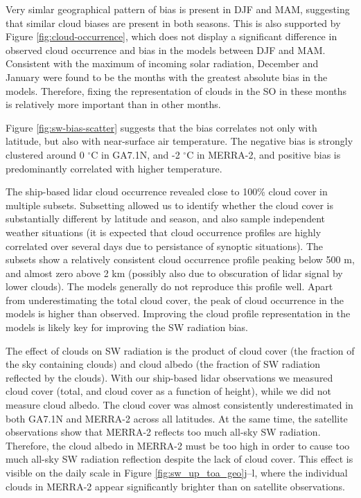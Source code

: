  Very simlar geographical pattern of bias is present in DJF and
MAM, suggesting that similar cloud biases are present in both seasons. This
is also supported by Figure \ref{fig:cloud-occurrence}, which does not display
a significant difference in observed cloud occurrence and bias in the models
between DJF and MAM.  Consistent with the maximum of incoming solar radiation,
December and January were found to be the months with the greatest absolute
bias in the models. Therefore, fixing the representation of clouds in the SO
in these months is relatively more important than in other months.

Figure \ref{fig:sw-bias-scatter} suggests that the bias correlates not only
with latitude, but also with near-surface air temperature. The negative bias
is strongly clustered around 0 $^\circ$C in GA7.1N, and -2 $^\circ$C in
MERRA-2, and positive bias is predominantly correlated with higher temperature.

The ship-based lidar cloud occurrence revealed close to 100\% cloud cover in
multiple subsets. Subsetting allowed us to identify whether the cloud cover is
substantially different by latitude and season, and also sample independent
weather situations (it is expected that cloud occurrence profiles are highly
correlated over several days due to persistance of synoptic situations). The
subsets show a relatively consistent cloud occurrence profile peaking below 500
m, and almost zero above 2 km (possibly also due to
obscuration of lidar signal by lower clouds). The models generally do not
reproduce this profile well. Apart from underestimating the total cloud cover,
the peak of cloud occurrence in the models is higher than observed. Improving
the cloud profile representation in the models is likely key for improving the
SW radiation bias.

The effect of clouds on SW radiation is the product of cloud cover (the
fraction of the sky containing clouds) and cloud albedo (the fraction of SW
radiation reflected by the clouds). With our ship-based lidar observations we
measured cloud cover (total, and cloud cover as a function of height), while we
did not measure cloud albedo. The cloud cover was almost consistently
underestimated in both GA7.1N and MERRA-2 across all latitudes. At the same
time, the satellite observations show that MERRA-2 reflects too much all-sky SW
radiation. Therefore, the cloud albedo in MERRA-2 must be too high in order to
cause too much all-sky SW radiation reflection despite the lack of cloud cover.
This effect is visible on the daily scale in Figure
\ref{fig:sw_up_toa_geo}j--l, where the individual clouds in MERRA-2 appear
significantly brighter than on satellite observations.


